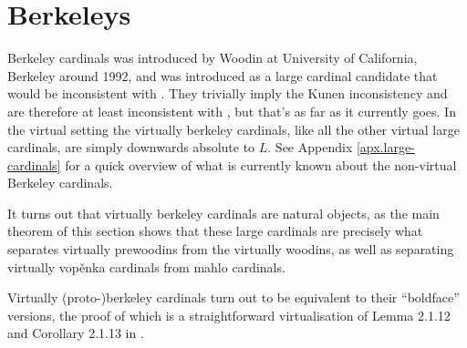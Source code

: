\documentclass[../../main]{subfiles}
\begin{document}
\section{Berkeleys}

Berkeley cardinals was introduced by Woodin at University of California, Berkeley around 1992, and was introduced as a large cardinal candidate that would be inconsistent with \zf. They trivially imply the Kunen inconsistency and are therefore at least inconsistent with \zfc, but that's as far as it currently goes. In the virtual setting the virtually berkeley cardinals, like all the other virtual large cardinals, are simply downwards absolute to $L$. See Appendix \ref{apx.large-cardinals} for a quick overview of what is currently known about the non-virtual Berkeley cardinals.

\qquad It turns out that virtually berkeley cardinals are natural objects, as the main theorem of this section shows that these large cardinals are precisely what separates virtually prewoodins from the virtually woodins, as well as separating virtually vop\v enka cardinals from mahlo cardinals.


Virtually (proto-)berkeley cardinals turn out to be equivalent to their ``boldface'' versions, the proof of which is a straightforward virtualisation of Lemma 2.1.12 and Corollary 2.1.13 in \cite{Cutolo}.

\end{document}
